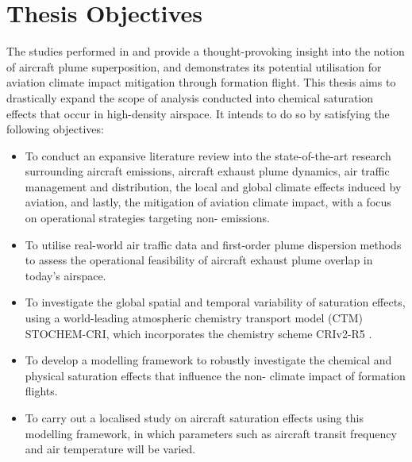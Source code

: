 \section{Thesis Objectives}
The studies performed in \cite{4} and \cite{9} provide a thought-provoking insight into the notion of aircraft plume superposition, and \cite{11} demonstrates its potential utilisation for aviation climate impact mitigation through formation flight. This thesis aims to drastically expand the scope of analysis conducted into chemical saturation effects that occur in high-density airspace. It intends to do so by satisfying the following objectives:
\begin{itemize}
    \item To conduct an expansive literature review into the state-of-the-art research surrounding aircraft emissions, aircraft exhaust plume dynamics, air traffic management and distribution, the local and global climate effects induced by aviation, and lastly, the mitigation of aviation climate impact, with a focus on operational strategies targeting non- emissions.
    \item To utilise real-world air traffic data and first-order plume dispersion methods to assess the operational feasibility of aircraft exhaust plume overlap in today’s airspace.
    \item To investigate the global spatial and temporal variability of  saturation effects, using a world-leading atmospheric chemistry transport model (CTM) STOCHEM-CRI, which incorporates the chemistry scheme CRIv2-R5 \cite{x}.
    \item To develop a modelling framework to robustly investigate the chemical and physical saturation effects that influence the non- climate impact of formation flights.
    \item To carry out a localised study on aircraft  saturation effects using this modelling framework, in which parameters such as aircraft transit frequency and air temperature will be varied. 
\end{itemize}